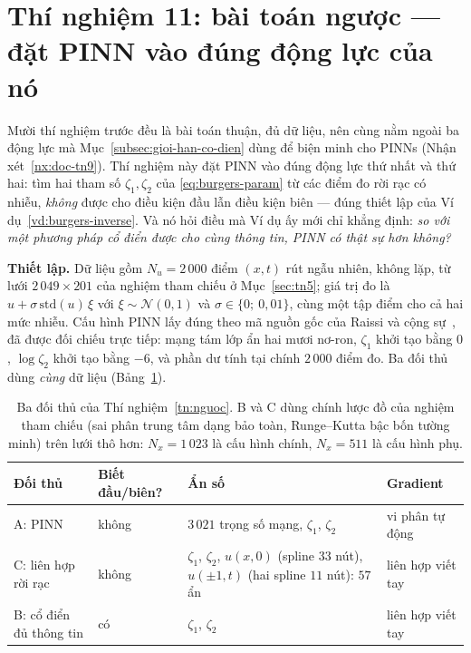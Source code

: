 \section{Thí nghiệm 11: bài toán ngược --- đặt PINN vào đúng động lực của nó}
\label{sec:tn11}

\begin{thinghiem}
\label{tn:nguoc}
Mười thí nghiệm trước đều là bài toán thuận, đủ dữ liệu, nên cùng nằm ngoài ba
động lực mà Mục~\ref{subsec:gioi-han-co-dien} dùng để biện minh cho PINNs
(Nhận xét~\ref{nx:doc-tn9}). Thí nghiệm này đặt PINN vào đúng động lực thứ nhất
và thứ hai: tìm hai tham số $\zeta_1, \zeta_2$ của \eqref{eq:burgers-param} từ
các điểm đo rời rạc có nhiễu, \emph{không} được cho điều kiện đầu lẫn điều kiện
biên --- đúng thiết lập của Ví dụ~\ref{vd:burgers-inverse}. Và nó hỏi điều mà Ví
dụ ấy mới chỉ khẳng định: \emph{so với một phương pháp cổ điển được cho cùng
thông tin, PINN có thật sự hơn không?}
\end{thinghiem}

\textbf{Thiết lập.} Dữ liệu gồm $N_u = 2\,000$ điểm $(x, t)$ rút ngẫu nhiên,
không lặp, từ lưới $2\,049\times201$ của nghiệm tham chiếu ở Mục~\ref{sec:tn5};
giá trị đo là $u + \sigma\,\mathrm{std}(u)\,\xi$ với $\xi \sim \mathcal N(0, 1)$
và $\sigma \in \{0;\ 0{,}01\}$, cùng một tập điểm cho cả hai mức nhiễu. Cấu hình
PINN lấy đúng theo mã nguồn gốc của Raissi và cộng sự~\cite{raissi2019}, đã
được đối chiếu trực tiếp: mạng tám lớp ẩn hai mươi nơ-ron, $\zeta_1$ khởi tạo
bằng $0$, $\log\zeta_2$ khởi tạo bằng $-6$, và phần dư tính tại chính $2\,000$
điểm đo. Ba đối thủ dùng \emph{cùng} dữ liệu (Bảng~\ref{tab:tn11-doithu}).

\begin{table}[H]
\centering
\caption[Ba đối thủ của bài toán ngược]{Ba đối thủ của
Thí nghiệm~\ref{tn:nguoc}. B và C dùng chính lược đồ của nghiệm tham chiếu (sai
phân trung tâm dạng bảo toàn, Runge--Kutta bậc bốn tường minh) trên lưới thô
hơn: $N_x = 1\,023$ là cấu hình chính, $N_x = 511$ là cấu hình phụ.}
\label{tab:tn11-doithu}
\footnotesize
\begin{tabular}{@{}l l p{5.2cm} l@{}}
\toprule
\textbf{Đối thủ} & \textbf{Biết đầu/biên?} & \textbf{Ẩn số} & \textbf{Gradient} \\
\midrule
A: PINN & không & $3\,021$ trọng số mạng, $\zeta_1$, $\zeta_2$
  & vi phân tự động \\
C: liên hợp rời rạc & không & $\zeta_1$, $\zeta_2$, $u(x, 0)$ (spline $33$ nút),
  $u(\pm1, t)$ (hai spline $11$ nút): $57$ ẩn & liên hợp viết tay \\
B: cổ điển đủ thông tin & có & $\zeta_1$, $\zeta_2$ & liên hợp viết tay \\
\bottomrule
\end{tabular}
\end{table}

